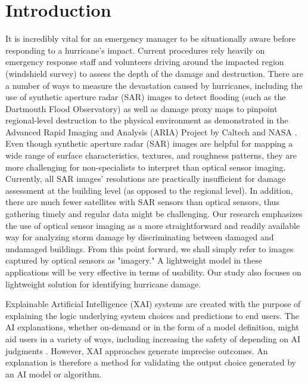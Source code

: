 \documentclass[conference]{IEEEtran}
\begin{document}
\section{Introduction}

It is incredibly vital for an emergency manager to be situationally aware before responding to a hurricane's impact. Current procedures rely heavily on emergency response staff and volunteers driving around the impacted region (windshield survey) to assess the depth of the damage and destruction. There are a number of ways to measure the devastation caused by hurricanes, including the use of synthetic aperture radar (SAR) images to detect flooding (such as the Dartmouth Flood Observatory) \cite{noauthor_flood_nodate} as well as damage proxy maps to pinpoint regional-level destruction to the physical environment as demonstrated in the Advanced Rapid Imaging and Analysis (ARIA) Project by Caltech and NASA \cite{noauthor_aria_nodate}. Even though synthetic aperture radar (SAR) images are helpful for mapping a wide range of surface characteristics, textures, and roughness patterns, they are more challenging for non-specialists to interpret than optical sensor imaging. Currently, all SAR images’ resolutions are practically insufficient for damage assessment at the building level (as opposed to the regional level). In addition, there are much fewer satellites with SAR sensors than optical sensors, thus gathering timely and regular data might be challenging. Our research emphasizes the use of optical sensor imaging as a more straightforward and readily available way for analyzing storm damage by discriminating between damaged and undamaged buildings. From this point forward, we shall simply refer to images captured by optical sensors as "imagery." A lightweight model in these applications will be very effective in terms of usability\cite{lw1,lw2}. Our study also focuses on lightweight solution for identifying hurricane damage.

Explainable Artificial Intelligence (XAI) systems are created with the purpose of explaining the logic underlying system choices and predictions to end users. The AI explanations, whether on-demand or in the form of a model definition, might aid users in a variety of ways, including increasing the safety of depending on AI judgments \cite{https://doi.org/10.48550/arxiv.1811.11839}. However, XAI approaches generate imprecise outcomes. An explanation is therefore a method for validating the output choice generated by an AI model or algorithm.
\end{document}
